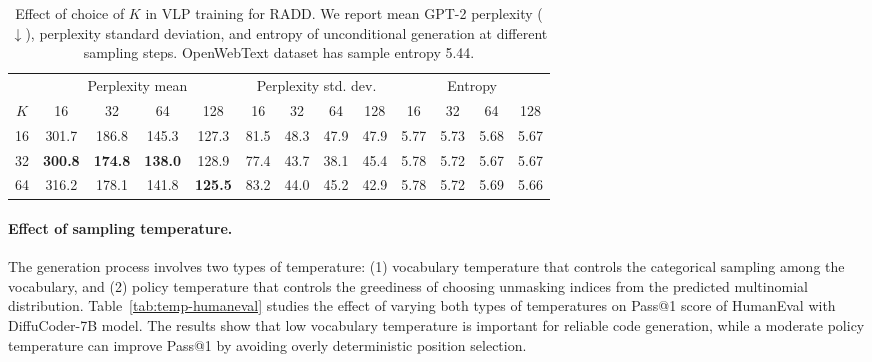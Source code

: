\begin{table}[h]
\centering
\caption{Effect of choice of $K$ in VLP training for RADD. We report mean GPT-2 perplexity ($\downarrow$), perplexity standard deviation, and entropy of unconditional generation at different sampling steps. OpenWebText dataset has sample entropy 5.44.}
\setlength{\tabcolsep}{4.0pt}
\begin{tabular}{ccccccccccccc}
\toprule
& \multicolumn{4}{c}{Perplexity mean}
& \multicolumn{4}{c}{Perplexity std. dev.}
& \multicolumn{4}{c}{Entropy} \\
\cmidrule(lr){2-5}\cmidrule(lr){6-9}\cmidrule(lr){10-13}
$K$
& 16 & 32 & 64 & 128
& 16 & 32 & 64 & 128
& 16 & 32 & 64 & 128 \\
\midrule
16
& 301.7 & 186.8 & 145.3 & 127.3
& 81.5 & 48.3 & 47.9 & 47.9
& 5.77 & 5.73 & 5.68 & 5.67 \\
32
& \textbf{300.8} & \textbf{174.8} & \textbf{138.0} & 128.9
& 77.4 & 43.7 & 38.1 & 45.4
& 5.78 & 5.72 & 5.67 & 5.67 \\
64
& 316.2 & 178.1 & 141.8 & \textbf{125.5}
& 83.2 & 44.0 & 45.2 & 42.9
& 5.78 & 5.72 & 5.69 & 5.66 \\
\bottomrule
\end{tabular}
\label{tab:text-step}
\end{table}

\paragraph{Effect of sampling temperature.} The generation process involves two types of temperature: (1) vocabulary temperature that controls the categorical sampling among the vocabulary, and (2) policy temperature that controls the greediness of choosing unmasking indices from the predicted multinomial distribution. Table~\ref{tab:temp-humaneval} studies the effect of varying both types of temperatures on Pass@1 score of HumanEval with DiffuCoder-7B model. The results show that low vocabulary temperature is important for reliable code generation, while a moderate policy temperature can improve Pass@1 by avoiding overly deterministic position selection.

